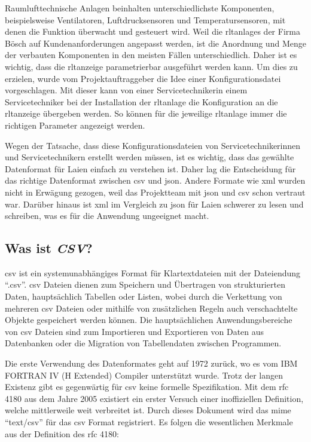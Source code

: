 Raumlufttechnische Anlagen beinhalten unterschiedlichste Komponenten, beispielsweise Ventilatoren, Luftdrucksensoren und Temperatursensoren, mit denen die Funktion überwacht und gesteuert wird. Weil die \acp{rltanlage} der Firma Bösch auf Kundenanforderungen angepasst werden, ist die Anordnung und Menge der verbauten Komponenten in den meisten Fällen unterschiedlich. Daher ist es wichtig, dass die \ac{rltanzeige} parametrierbar ausgeführt werden kann. Um dies zu erzielen, wurde vom Projektauftraggeber die Idee einer Konfigurationsdatei vorgeschlagen. Mit dieser kann von einer  Servicetechnikerin \bzw einem Servicetechniker bei der Installation der \ac{rltanlage} die Konfiguration an die \ac{rltanzeige} übergeben werden. So können für die jeweilige \ac{rltanlage} immer die richtigen Parameter angezeigt werden.

Wegen der Tatsache, dass diese Konfigurationsdateien von Servicetechnikerinnen und Servicetechnikern erstellt werden müssen, ist es wichtig, dass das gewählte Datenformat für Laien einfach zu verstehen ist. Daher lag die Entscheidung für das richtige Datenformat zwischen \ac{csv} und \ac{json}. Andere Formate  wie \acf{xml} wurden nicht in Erwägung gezogen, weil das Projektteam mit \ac{json} und \ac{csv} schon vertraut war. Darüber hinaus ist \ac{xml} im Vergleich zu \ac{json} für Laien schwerer zu lesen und schreiben, was es für die Anwendung ungeeignet macht. 

\subsection{Was ist \textit{CSV}?}\label{csv_kapitel}
\acf{csv} ist ein systemunabhängiges Format für Klartextdateien mit der Dateiendung \enquote{.csv}. \ac{csv} Dateien dienen zum Speichern und Übertragen von strukturierten Daten, hauptsächlich Tabellen oder Listen, wobei durch die Verkettung von mehreren \ac{csv} Dateien oder mithilfe von zusätzlichen Regeln auch verschachtelte Objekte gespeichert werden können. Die hauptsächlichen Anwendungsbereiche von \ac{csv} Dateien sind zum Importieren und Exportieren von Daten aus Datenbanken oder die Migration von Tabellendaten zwischen Programmen. \cite[vgl.][]{FuchsMediaSolutions:o.J.}

Die erste Verwendung des Datenformates geht auf 1972 zurück, wo es vom IBM FORTRAN IV (H Extended) Compiler unterstützt wurde. \cite[vgl.][]{IBM:1972} Trotz der langen Existenz gibt es gegenwärtig für \ac{csv} keine formelle Spezifikation. Mit dem \ac{rfc} 4180 \cite[vgl.][]{Shafranovich:2005} aus dem Jahre 2005 existiert ein erster Versuch einer inoffiziellen Definition, welche mittlerweile weit verbreitet ist. Durch dieses Dokument wird das \acf{mime} \enquote{text/csv} für das \ac{csv} Format registriert. Es folgen die wesentlichen Merkmale aus der Definition des \ac{rfc} 4180:

